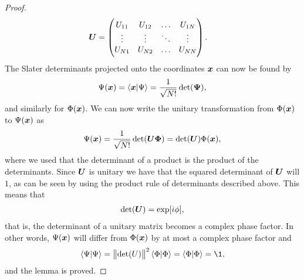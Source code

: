 \begin{proof}
\begin{align}
                    \boldsymbol{U}
                    &= \begin{pmatrix}
                        U_{11} & U_{12} & \dots & U_{1N} \\
                        \vdots & \vdots & \ddots & \vdots \\
                        U_{N1} & U_{N2} & \dots & U_{NN}
                    \end{pmatrix}.
                \end{align}
                The Slater determinants projected onto the coordinates $\boldsymbol{x}$
                can now be found by
                \begin{align}
                    \Psi(\boldsymbol{x})
                    = \braket{\boldsymbol{x}}{\Psi}
                    = \frac{1}{\sqrt{N!}}\det(\boldsymbol{\Psi}),
                \end{align}
                and similarly for $\Phi(\boldsymbol{x})$.
                We can now write the unitary transformation from $\Phi(\boldsymbol{x})$
                to $\Psi(\boldsymbol{x})$ as
                \begin{align}
                    \Psi(\boldsymbol{x})
                    = \frac{1}{\sqrt{N!}}
                    \det(\boldsymbol{U}\boldsymbol{\Phi})
                    = \det(\boldsymbol{U})\Phi(\boldsymbol{x}),
                \end{align}
                where we used that the determinant of a product is the product
                of the determinants.
                Since $\boldsymbol{U}$ is unitary we have that the squared determinant
                of $\boldsymbol{U}$ will $1$, as can be seen by using the product rule
                of determinants described above.
                This means that
                \begin{align}
                    \det(\boldsymbol{U}) = \exp[i\phi],
                \end{align}
                that is, the determinant of a unitary matrix becomes a complex
                phase factor.
                In other words, $\Psi(\boldsymbol{x})$ will differ from $\Phi(\boldsymbol{x})$
                by at most a complex phase factor and
                \begin{align}
                    \braket{\Psi}
                    = \norm{\det(U)}^2\braket{\Phi}
                    = \braket{\Phi}
                    = \1,
                \end{align}
                and the lemma is proved.
            \end{proof}

